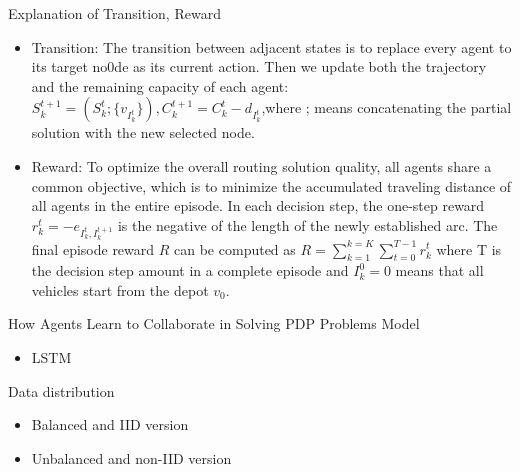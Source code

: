 \documentclass{beamer}
\begin{document}
\begin{frame}{Explanation of Transition, Reward}
	\begin{itemize}
		\item Transition: The transition between adjacent states is to replace every agent to its target no0de as its current action. Then we update both the trajectory and the remaining capacity of each agent: $S_k^{t+1}=(S_k^t;\{v_{I_k^t}\}), C_k^{t+1}=C_k^t-d_{I_k^t}$,where ; means concatenating the partial solution with the new selected node.
		\item Reward: To optimize the overall routing solution quality, all agents share a common objective, which is to minimize the accumulated traveling distance of all agents in the entire episode. In each decision step, the one-step reward $r_k^t=-e_{I_k^t,I_k^{t+1}}$ is the negative of the length of the newly established arc. The final episode reward $R$ can be computed as $R=\sum_{k=1}^{k=K}\sum_{t=0}^{T-1}r_k^t$ where T is the decision step amount in a complete episode and $I_k^0=0$ means that all vehicles start from the depot $v_0$.
	\end{itemize}
\end{frame}
\begin{frame}{How Agents Learn to Collaborate in Solving PDP Problems}
	Model
	\begin{itemize}
		\item LSTM\cite{kim2016character}
	\end{itemize}
	Data distribution
	\begin{itemize}
		\item Balanced and IID version
		\item Unbalanced and non-IID version
	\end{itemize}
\end{frame}

\end{document}
